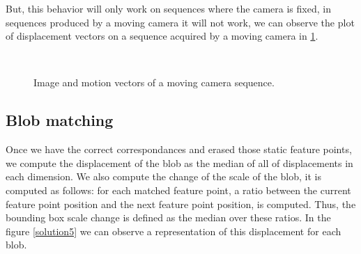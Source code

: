 But, this behavior will only work on sequences where the camera is fixed, in sequences produced by a moving camera it will not work, we can observe the plot of displacement vectors on a sequence acquired by a moving camera in \ref{motion3}. 

\begin{figure}[H]
		
\centering

\\
\caption{Image and motion vectors of a moving camera sequence.}
\label{motion3}
\end{figure}


\subsection{Blob matching}


Once we have the correct correspondances and erased those static feature points, we compute the displacement of the blob as the median of all of displacements in each dimension. We also compute the change of the scale of the blob, it is computed as follows: for each matched feature point, a ratio between the current feature point position and the next feature point position, is computed. Thus, the bounding box scale change is defined as the median over these ratios. In the figure \ref{solution5} we can observe a representation of this displacement for each blob.



